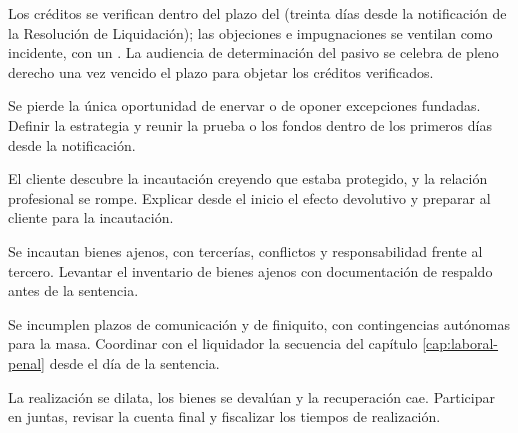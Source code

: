 Los créditos se verifican dentro del plazo del  (treinta días desde la notificación de la
Resolución de Liquidación); las objeciones e impugnaciones se ventilan como incidente, con un
. La audiencia de determinación del pasivo se
celebra de pleno derecho una vez vencido el plazo para objetar los créditos verificados.

\bloqueErrores

{Se pierde la única oportunidad de enervar o de oponer excepciones fundadas.}
{Definir la estrategia y reunir la prueba o los fondos dentro de los primeros días desde
la notificación.}

{El cliente descubre la incautación creyendo que estaba protegido, y la relación
profesional se rompe.}
{Explicar desde el inicio el efecto devolutivo y preparar al cliente para la incautación.}

{Se incautan bienes ajenos, con tercerías, conflictos y responsabilidad frente al
tercero.}
{Levantar el inventario de bienes ajenos con documentación de respaldo antes de la
sentencia.}

{Se incumplen plazos de comunicación y de finiquito, con contingencias autónomas para la
masa.}
{Coordinar con el liquidador la secuencia del capítulo \ref{cap:laboral-penal} desde el
día de la sentencia.}

{La realización se dilata, los bienes se devalúan y la recuperación cae.}
{Participar en juntas, revisar la cuenta final y fiscalizar los tiempos de realización.}
